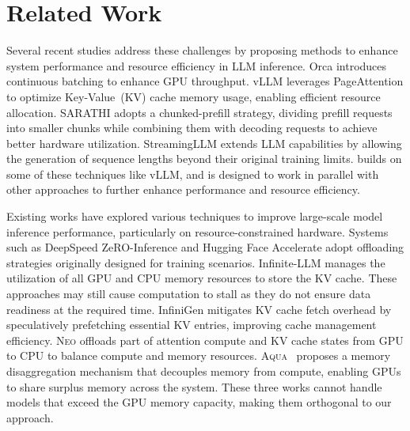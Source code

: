 \section{Related Work}
\label{sec:relwk}


Several recent studies address these challenges by proposing methods to enhance system performance and resource efficiency in LLM inference. 
Orca\cite{orca} introduces continuous batching to enhance GPU throughput. 
vLLM\cite{vllm} leverages PageAttention to optimize Key-Value~(KV) cache memory usage, enabling efficient resource allocation. 
SARATHI\cite{sarathi} adopts a chunked-prefill strategy, dividing prefill requests into smaller chunks while combining them with decoding requests to achieve better hardware utilization. 
StreamingLLM\cite{StreamingLLM} extends LLM capabilities by allowing the generation of sequence lengths beyond their original training limits. 
\sys builds on some of these techniques like vLLM, and is designed to work in parallel with other approaches to further enhance performance and resource efficiency.

Existing works have explored various techniques to improve large-scale model inference performance, particularly on resource-constrained hardware. 
Systems such as DeepSpeed ZeRO-Inference\cite{zero-infer} and Hugging Face Accelerate\cite{huggingface} adopt offloading strategies originally designed for training scenarios. 
Infinite-LLM\cite{lin2024infinitellmefficientllmservice} manages the utilization of all GPU and CPU memory resources to store the KV cache.
These approaches may still cause computation to stall as they do not ensure data readiness at the required time.
InfiniGen\cite{infinigen} mitigates KV cache fetch overhead by speculatively prefetching essential KV entries, improving cache management efficiency. 
\textsc{Neo}\cite{jiangxuanlin} offloads part of attention compute and KV cache states from GPU to CPU to balance compute and memory resources.
\textsc{Aqua}~\cite{aqua} proposes a memory disaggregation mechanism that decouples memory from compute, enabling GPUs to share surplus memory across the system.
These three works cannot handle models that exceed the GPU memory capacity, making them orthogonal to our approach.

